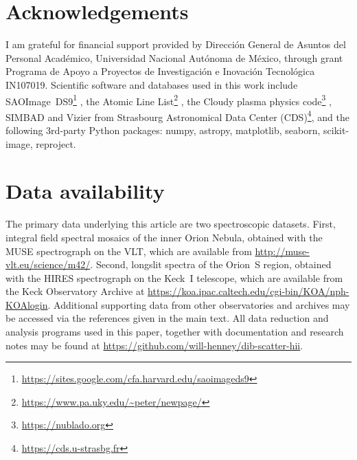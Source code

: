 \documentclass[useAMS, usenatbib, a4paper]{mnras}
\begin{document}
\section*{Acknowledgements}
I am grateful for financial support provided by
\foreignlanguage{spanish}{
  Dirección General de Asuntos del Personal Académico,
  Universidad Nacional Autónoma de México},
through grant
\foreignlanguage{spanish}{
  Programa de Apoyo a Proyectos de Investigación
  e Inovación Tecnológica}
IN107019.
Scientific software and databases used in this work include
SAOImage~DS9\footnote{\url{https://sites.google.com/cfa.harvard.edu/saoimageds9}} \citep{Joye:2003a},
the Atomic Line List\footnote{\url{https://www.pa.uky.edu/~peter/newpage/}} \citep{Van-Hoof:2018a},
the Cloudy plasma physics code\footnote{\url{https://nublado.org}}
\citep{Ferland:2017a},
SIMBAD and Vizier from Strasbourg Astronomical Data Center (CDS)\footnote{\url{https://cds.u-strasbg.fr}},
and the following 3rd-party Python packages:
numpy, astropy, matplotlib, seaborn, scikit-image, reproject.


\section*{Data availability}
\label{sec:data-availability}

The primary data underlying this article are two spectroscopic datasets.
First, integral field spectral mosaics of the inner Orion Nebula,
obtained with the MUSE spectrograph on the VLT,
which are available from \url{http://muse-vlt.eu/science/m42/}.
Second, longslit spectra of the Orion~S region,
obtained with the HIRES spectrograph on the Keck~I telescope,
which are available from the Keck Observatory Archive at
\url{https://koa.ipac.caltech.edu/cgi-bin/KOA/nph-KOAlogin}.
Additional supporting data from other observatories and archives
may be accessed via the references given in the main text.
All data reduction and analysis programs used in this paper,
together with documentation and research notes may be found at
\url{https://github.com/will-henney/dib-scatter-hii}.
\end{document}
